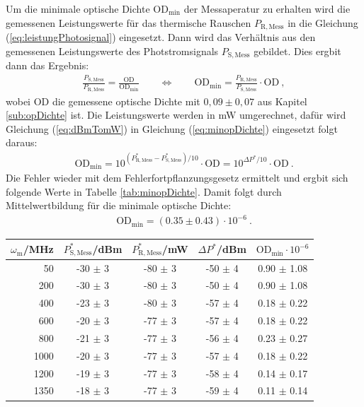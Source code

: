 Um die minimale optische Dichte $\mathrm{OD}_\mathrm{min}$ der Messaperatur zu erhalten wird die gemessenen Leistungswerte für das thermische Rauschen $P_\mathrm{R,Mess}$ in die Gleichung (\ref{eq:leistungPhotosignal}) eingesetzt. Dann wird das Verhältnis aus den gemessenen Leistungswerte des Photstromsignals $P_\mathrm{S,Mess}$ gebildet. Dies ergbit dann das Ergebnis:
\begin{gather}
    \frac{P_\mathrm{S,Mess}}{P_\mathrm{R,Mess}} = \frac{\mathrm{OD}}{\mathrm{OD}_\mathrm{min}} \qquad \Leftrightarrow \qquad \mathrm{OD}_\mathrm{min} = \frac{P_\mathrm{R,Mess}}{P_\mathrm{S,Mess}} \cdot \mathrm{OD}~,
    \label{eq:minopDichte}
\end{gather}
wobei $\mathrm{OD}$ die gemessene optische Dichte mit $0,09 \pm 0,07$ aus Kapitel \ref{sub:opDichte} ist. Die Leistungswerte werden in mW umgerechnet, dafür wird Gleichung (\ref{eq:dBmTomW}) in Gleichung (\ref{eq:minopDichte}) eingesetzt folgt daraus:
\begin{gather}
    \mathrm{OD}_\mathrm{min} = 10^{(P^*_\mathrm{R,Mess} - P^*_\mathrm{S,Mess})/10} \cdot \mathrm{OD} = 10^{\Delta P^*/10} \cdot \mathrm{OD}~.
\end{gather}
Die Fehler wieder mit dem Fehlerfortpflanzungsgesetz ermittelt und ergbit sich folgende Werte in Tabelle \ref{tab:minopDichte}. Damit folgt durch Mittelwertbildung für die minimale optische Dichte:
\begin{gather}
    \boxed{\mathrm{OD}_\mathrm{min} = (0.35 \pm 0.43) \cdot 10^{-6}}~.
\end{gather}

\begin{center}
    \captionsetup{type=table}
    \begin{tabular}{r | c c c | c}
        $\omega_\mathrm{m}$/MHz & $P^*_\mathrm{S,Mess}$/dBm & $P^*_\mathrm{R,Mess}$/mW & $\Delta P^*$/dBm & $ \mathrm{OD}_\mathrm{min} \cdot 10^{-6}$ \\ \hline
        50   & -30 $\pm$ 3 & -80 $\pm$ 3 & -50 $\pm$ 4 & 0.90 $\pm$ 1.08 \\
        200  & -30 $\pm$ 3 & -80 $\pm$ 3 & -50 $\pm$ 4 & 0.90 $\pm$ 1.08 \\
        400  & -23 $\pm$ 3 & -80 $\pm$ 3 & -57 $\pm$ 4 & 0.18 $\pm$ 0.22 \\
        600  & -20 $\pm$ 3 & -77 $\pm$ 3 & -57 $\pm$ 4 & 0.18 $\pm$ 0.22 \\
        800  & -21 $\pm$ 3 & -77 $\pm$ 3 & -56 $\pm$ 4 & 0.23 $\pm$ 0.27 \\
        1000 & -20 $\pm$ 3 & -77 $\pm$ 3 & -57 $\pm$ 4 & 0.18 $\pm$ 0.22 \\
        1200 & -19 $\pm$ 3 & -77 $\pm$ 3 & -58 $\pm$ 4 & 0.14 $\pm$ 0.17 \\
        1350 & -18 $\pm$ 3 & -77 $\pm$ 3 & -59 $\pm$ 4 & 0.11 $\pm$ 0.14 \\
    \end{tabular}
    \label{tab:minopDichte}
\end{center}








